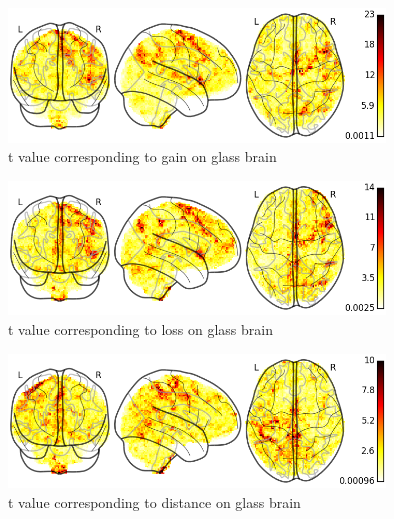 \begin{figure}[h!]
\centering
\includegraphics[width=100mm]{images/t_glass_brain_gain.png}               
\caption{t value corresponding to gain on glass brain}
\label{fig:t_glass1}
\end{figure}

\begin{figure}[h!]
\centering
\includegraphics[width=100mm]{images/t_glass_brain_loss.png}               
\caption{t value corresponding to loss on glass brain}
\label{fig:t_glass2}
\end{figure}

\begin{figure}[h!]
\centering
\includegraphics[width=100mm]{images/t_glass_brain_dist.png}               
\caption{t value corresponding to distance on glass brain}
\label{fig:t_glass3}
\end{figure}